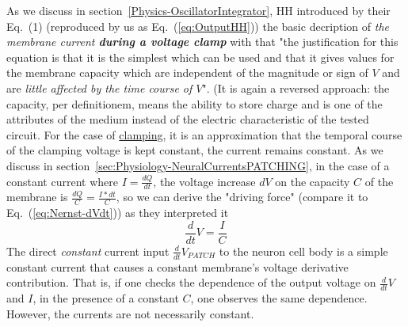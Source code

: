 As we discuss in section~\ref{Physics-OscillatorIntegrator}, HH introduced 
by their Eq.~(1) (reproduced by us as Eq.~(\ref{eq:OutputHH}))
the basic decription of \textit{the membrane current \textbf{during a voltage clamp}} with that 
"the justification for this equation is that it is the simplest which can be used
and that it gives values for the membrane capacity which are independent of
the magnitude or sign of $V$ and are \textit{little affected by the time course of $V$}".
(It is again a reversed approach: the capacity, per definitionem, means the ability to store charge
and is one of the attributes of the medium instead of the electric characteristic
of the tested circuit. For the case of \hyperlink{voltage-clamping}{clamping}, it is an approximation
that the temporal course of the clamping voltage
is kept constant, the current remains constant.  
As we discuss in section~\ref{sec:Physiology-NeuralCurrentsPATCHING},
in the case of a constant current where $I=\frac{dQ}{dt}$,  the voltage increase $dV$
on the capacity $C$ of the membrane is $\frac{dQ}{C}=\frac{I*dt}{C}$,
so we can derive the "driving force" (compare it to Eq.~(\ref{eq:Nernst-dVdt}))
as they interpreted it
%
\[\frac{d}{dt} V=\frac{I}{C}\label{eq:Physiology-HHDrivingForce}\]
%
The direct \textit{constant} current input $\frac{d}{dt} V_{PATCH}$
to the neuron cell body is a simple constant current that causes a constant membrane's voltage derivative contribution.
That is, if one checks the dependence of the output voltage on $\frac{d}{dt} V$ and $I$, in the presence of a constant $C$,
one observes the same dependence.
However, the currents are not necessarily constant.



